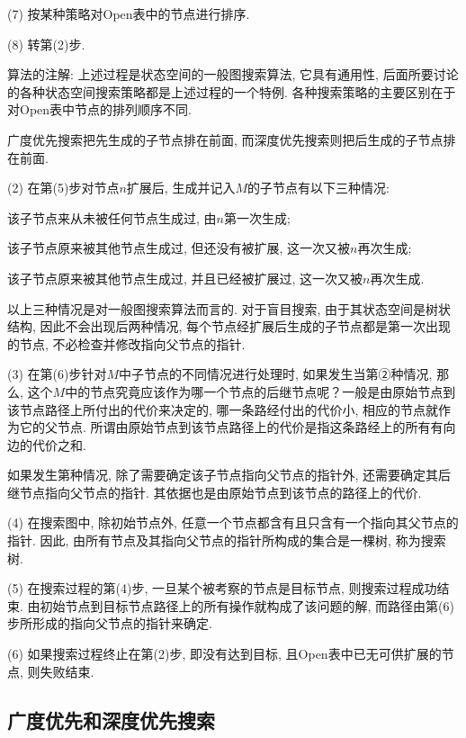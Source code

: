 (7) 按某种策略对Open表中的节点进行排序.

(8) 转第(2)步.
\begin{remark}
算法的注解: 上述过程是状态空间的一般图搜索算法, 它具有通用性, 后面所要讨论的各种状态空间搜索策略都是上述过程的一个特例. 各种搜索策略的主要区别在于对Open表中节点的排列顺序不同.
\begin{example}
  广度优先搜索把先生成的子节点排在前面, 而深度优先搜索则把后生成的子节点排在前面.
\end{example}

(2) 在第(5)步对节点$n$扩展后, 生成并记入$M$的子节点有以下三种情况:

    \quad {} 该子节点来从未被任何节点生成过, 由$n$第一次生成;

    \quad {} 该子节点原来被其他节点生成过, 但还没有被扩展, 这一次又被$n$再次生成;

    \quad {} 该子节点原来被其他节点生成过, 并且已经被扩展过, 这一次又被$n$再次生成.

以上三种情况是对一般图搜索算法而言的. 对于盲目搜索, 由于其状态空间是树状结构, 因此不会出现后两种情况, 每个节点经扩展后生成的子节点都是第一次出现的节点, 不必检查并修改指向父节点的指针.

(3) 在第(6)步针对$M$中子节点的不同情况进行处理时, 如果发生当第②种情况, 那么, 这个$M$中的节点究竟应该作为哪一个节点的后继节点呢？一般是由原始节点到该节点路径上所付出的代价来决定的, 哪一条路经付出的代价小, 相应的节点就作为它的父节点. 所谓由原始节点到该节点路径上的代价是指这条路经上的所有有向边的代价之和.

如果发生第种情况, 除了需要确定该子节点指向父节点的指针外, 还需要确定其后继节点指向父节点的指针. 其依据也是由原始节点到该节点的路径上的代价.

(4) 在搜索图中, 除初始节点外, 任意一个节点都含有且只含有一个指向其父节点的指针. 因此, 由所有节点及其指向父节点的指针所构成的集合是一棵树, 称为搜索树.

(5) 在搜索过程的第(4)步, 一旦某个被考察的节点是目标节点, 则搜索过程成功结束. 由初始节点到目标节点路径上的所有操作就构成了该问题的解, 而路径由第(6)步所形成的指向父节点的指针来确定.

(6) 如果搜索过程终止在第(2)步, 即没有达到目标, 且\textup{Open}表中已无可供扩展的节点, 则失败结束.
\end{remark}
\subsection{广度优先和深度优先搜索}
